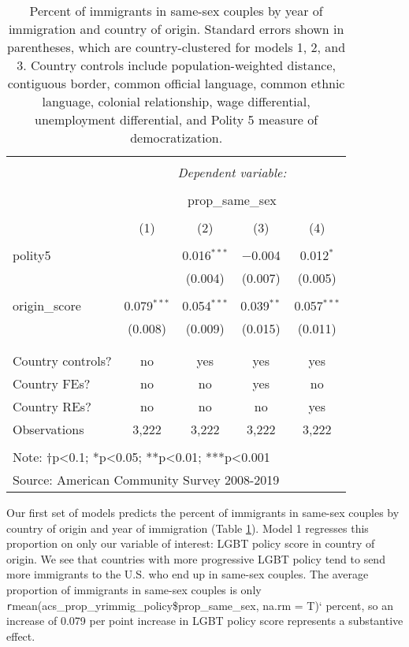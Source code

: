\documentclass[
  11pt,
]{article}
\begin{document}
\begin{table}[!htbp] \centering 
  \caption{Percent of immigrants in same-sex couples by year of immigration and country of origin. Standard errors shown in parentheses, which are country-clustered for models 1, 2, and 3. Country controls include population-weighted distance, contiguous border, common official language, common ethnic language, colonial relationship, wage differential, unemployment differential, and Polity 5 measure of democratization.} 
  \label{tab:country-props} 
\begin{tabular}{@{\extracolsep{5pt}}lcccc} 
\\[-1.8ex]\hline 
\hline \\[-1.8ex] 
 & \multicolumn{4}{c}{\textit{Dependent variable:}} \\ 
\cline{2-5} 
\\[-1.8ex] & \multicolumn{4}{c}{prop\_same\_sex} \\ 
\\[-1.8ex] & (1) & (2) & (3) & (4)\\ 
\hline \\[-1.8ex] 
 polity5 &  & 0.016$^{***}$ & $-$0.004 & 0.012$^{*}$ \\ 
  &  & (0.004) & (0.007) & (0.005) \\ 
  & & & & \\ 
 origin\_score & 0.079$^{***}$ & 0.054$^{***}$ & 0.039$^{**}$ & 0.057$^{***}$ \\ 
  & (0.008) & (0.009) & (0.015) & (0.011) \\ 
  & & & & \\ 
\hline \\[-1.8ex] 
Country controls? & no & yes & yes & yes \\ 
Country FEs? & no & no & yes & no \\ 
Country REs? & no & no & no & yes \\ 
Observations & 3,222 & 3,222 & 3,222 & 3,222 \\ 
\hline 
\hline \\[-1.8ex] 
\multicolumn{5}{l}{Note: †p<0.1; *p<0.05; **p<0.01; ***p<0.001} \\ 
\multicolumn{5}{l}{Source: American Community Survey 2008-2019} \\ 
\end{tabular} 
\end{table}

Our first set of models predicts the percent of immigrants in same-sex couples by country of origin and year of immigration (Table \ref{tab:country-props}). Model 1 regresses this proportion on only our variable of interest: LGBT policy score in country of origin. We see that countries with more progressive LGBT policy tend to send more immigrants to the U.S. who end up in same-sex couples. The average proportion of immigrants in same-sex couples is only \texttt{r}mean(acs\_prop\_yrimmig\_policy\$prop\_same\_sex, na.rm = T)` percent, so an increase of 0.079 per point increase in LGBT policy score represents a substantive effect.
\end{document}
